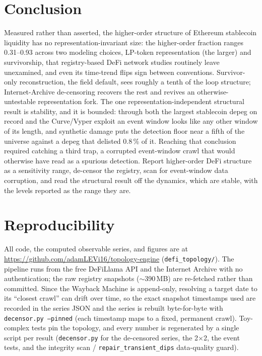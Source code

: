 \documentclass[10pt,twocolumn]{article}
\newcommand{\percent}{\%}
\newcommand{\SI}[2]{#1\,#2}
\begin{document}
\section{Conclusion}

Measured rather than asserted, the higher-order structure of Ethereum stablecoin liquidity
has no representation-invariant size: the higher-order fraction ranges 0.31--0.93 across two
modeling choices, LP-token representation (the larger) and survivorship, that
registry-based DeFi network studies routinely leave unexamined, and even its time-trend flips sign
between conventions. Survivor-only reconstruction, the field default, sees roughly a tenth
of the loop structure; Internet-Archive de-censoring recovers the rest and revives an
otherwise-untestable representation fork. The one representation-independent structural
result is stability, and it is bounded: through both the largest stablecoin depeg on record
and the Curve/Vyper exploit an event window looks like any other window of its length, and
synthetic damage puts the detection floor near a fifth of the universe against a depeg
that delisted \SI{0.8}{\percent} of it. Reaching that conclusion required catching a third
trap, a corrupted event-window crawl that would
otherwise have read as a spurious detection. Report higher-order DeFi structure as a
sensitivity range, de-censor the registry, scan for event-window data corruption, and read
the structural result off the dynamics, which are stable, with the levels reported as the
range they are.

\section*{Reproducibility}
All code, the computed observable series, and figures are at
\url{https://github.com/adamLEVi16/topology-engine} (\texttt{defi\_topology/}). The pipeline
runs from the free DeFiLlama API and the Internet Archive with no authentication; the raw
registry snapshots ($\sim$390\,MB) are re-fetched rather than committed. Since the
Wayback Machine is append-only, resolving a target date to its ``closest crawl'' can drift
over time, so the exact snapshot timestamps used are recorded in the series JSON and the
series is rebuilt byte-for-byte with \texttt{decensor.py --pinned} (each timestamp maps to a
fixed, permanent crawl). Toy-complex tests pin the topology, and every number is regenerated
by a single script per result (\texttt{decensor.py} for the de-censored series, the
2$\times$2, the event tests,
and the integrity scan / \texttt{repair\_transient\_dips} data-quality guard).
\end{document}
